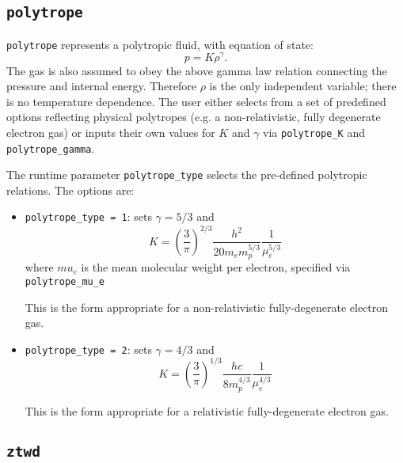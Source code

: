 \subsection{\tt polytrope}

{\tt polytrope} represents a polytropic fluid, with equation of
  state:
\begin{equation}
  p = K \rho^\gamma.
\end{equation}
The gas is also assumed to obey the above gamma law relation
connecting the pressure and internal energy. Therefore $\rho$ is the
only independent variable; there is no temperature dependence. The
user either selects from a set of predefined options reflecting
physical polytropes (e.g. a non-relativistic, fully degenerate
electron gas) or inputs their own values for $K$ and $\gamma$
via {\tt polytrope\_K} and {\tt polytrope\_gamma}.

The runtime parameter {\tt polytrope\_type} selects the pre-defined
polytropic relations.  The options are:
\begin{itemize}
  \item {\tt polytrope\_type = 1}: sets $\gamma = 5/3$ and
    \begin{equation}
      K = \left ( \frac{3}{\pi} \right)^{2/3} \frac{h^2}{20 m_e m_p^{5/3}} \frac{1}{\mu_e^{5/3}}
    \end{equation}
    where $mu_e$ is the mean molecular weight per electron, specified via {\tt polytrope\_mu\_e}

    This is the form appropriate for a non-relativistic
    fully-degenerate electron gas.

  \item {\tt polytrope\_type = 2}: sets $\gamma = 4/3$ and
    \begin{equation}
      K = \left ( \frac{3}{\pi} \right)^{1/3} \frac{hc}{8 m_p^{4/3}} \frac{1}{\mu_e^{4/3}}
    \end{equation}

    This is the form appropriate for a relativistic fully-degenerate
    electron gas.

\end{itemize}


\subsection{\tt ztwd}

